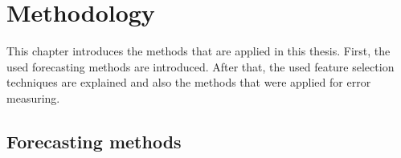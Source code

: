 \chapter{Methodology}
\label{ch:methods}

This chapter introduces the methods that are applied in this thesis. First, the used forecasting methods are introduced. After that, the used feature selection techniques are explained and also the methods that were applied for error measuring.\\


%
%

\section{Forecasting methods}
\label{sec:forecastmet}

